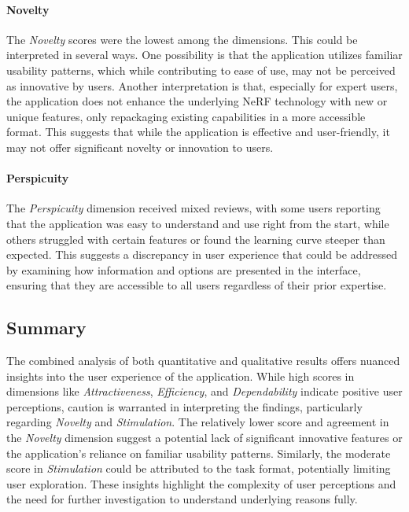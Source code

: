 \paragraph{Novelty}
The \emph{Novelty} scores were the lowest among the dimensions. This could be interpreted in several ways. 
One possibility is that the application utilizes familiar usability patterns, which while contributing to ease of use, may not be perceived as innovative by users. 
Another interpretation is that, especially for expert users, the application does not enhance the underlying NeRF technology with new or unique features, only repackaging existing capabilities in a more accessible format. 
This suggests that while the application is effective and user-friendly, it may not offer significant novelty or innovation to users.

\paragraph{Perspicuity}
The \emph{Perspicuity} dimension received mixed reviews, with some users reporting that the application was easy to understand and use right from the start, while others struggled with certain features or found the learning curve steeper than expected. 
This suggests a discrepancy in user experience that could be addressed by examining how information and options are presented in the interface, ensuring that they are accessible to all users regardless of their prior expertise.

\subsection*{Summary}
\label{subsec:findings:summary}

The combined analysis of both quantitative and qualitative results offers nuanced insights into the user experience of the application. 
While high scores in dimensions like \emph{Attractiveness}, \emph{Efficiency}, and \emph{Dependability} indicate positive user perceptions, caution is warranted in interpreting the findings, particularly regarding \emph{Novelty} and \emph{Stimulation}. 
The relatively lower score and agreement in the \emph{Novelty} dimension suggest a potential lack of significant innovative features or the application's reliance on familiar usability patterns. 
Similarly, the moderate score in \emph{Stimulation} could be attributed to the task format, potentially limiting user exploration. 
These insights highlight the complexity of user perceptions and the need for further investigation to understand underlying reasons fully.
